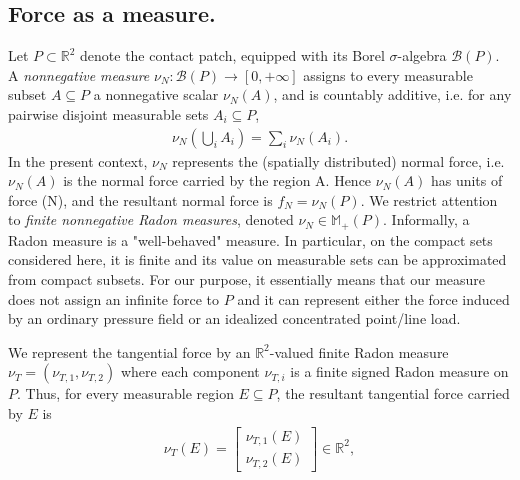 \documentclass[11pt,a4paper]{article}
\theoremstyle{plain}
\begin{document}
\subsection{Force as a measure.}
Let $P\subset\mathbb R^2$ denote the contact patch, equipped with its Borel
$\sigma$-algebra $\mathcal B(P)$. A \textit{nonnegative measure} $\nu_N:\mathcal B(P)\rightarrow[0,+\infty]$ assigns to every measurable subset $A\subseteq P$ a nonnegative scalar $\nu_N(A)$, and is countably additive, i.e. for any pairwise disjoint measurable sets $A_i \subseteq P$,
\begin{align}
\nu_N\left(\bigcup_i A_i\right) =\sum_i \nu_N(A_i).
\end{align}
In the present context, $\nu_N$ represents the (spatially distributed) normal force, i.e. $\nu_N(A)$ is the normal force carried by the region A. Hence $\nu_N(A)$ has units of force (N), and the resultant normal force is $f_N=\nu_N(P)$. We restrict attention to \textit{finite nonnegative Radon measures}, denoted $\nu_N\in\mathbb M_+(P)$. Informally, a Radon measure is a "well-behaved" measure. In particular, on the compact sets considered here, it is finite and its value on measurable sets can be approximated from compact subsets. For our purpose, it essentially means that our measure does not assign an infinite force to $P$ and it can represent either the force induced by an ordinary pressure field or an idealized concentrated point/line load.

We represent the tangential force by an $\mathbb R^2$-valued finite Radon measure $\nu_T=(\nu_{T,1},\nu_{T,2})$ where each component $\nu_{T,i}$ is a finite signed Radon measure on $P$. Thus, for every measurable region $E\subseteq P$, the resultant tangential force carried by $E$ is
\begin{align}
    \nu_T(E)
    =
    \begin{bmatrix}
    \nu_{T,1}(E)\\
    \nu_{T,2}(E)
    \end{bmatrix}
    \in\mathbb R^2,
\end{align}
\end{document}
